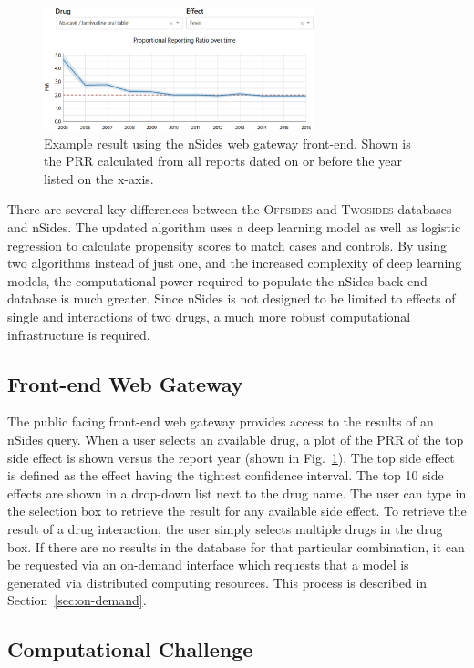\documentclass{ws-procs11x85}
\begin{document}
\begin{figure}[h]
\centerline{\includegraphics[width=0.7\textwidth]{prr}}
\caption{Example result using the nSides web gateway front-end. Shown
  is the PRR calculated from all reports dated on or before the year listed on the
  x-axis.}
\label{fig:prr}
\end{figure}

There are several key differences between the O\textsc{ffsides} and
T\textsc{wosides} databases and nSides. The updated algorithm uses a
deep learning model as well as logistic regression to calculate
propensity scores to match cases and controls. By using two algorithms
instead of just one, and the increased complexity of deep learning
models, the computational power required to populate the nSides
back-end database is much greater. Since nSides is not designed to be
limited to effects of single and interactions of two drugs, a much
more robust computational infrastructure is required.

\subsection{Front-end Web Gateway}
The public facing front-end web gateway provides access to the results
of an nSides query. When a user selects an available drug, a plot of the PRR of
the top side effect is shown versus the report year (shown in
Fig.~\ref{fig:prr}).  The top side effect is defined as the effect
having the tightest confidence interval. The top 10 side effects are
shown in a drop-down list next to the drug name. The user can type
in the selection box to retrieve the result for any available side
effect. To retrieve the result of a drug interaction, the user simply
selects multiple drugs in the drug box. If there are no results in the
database for that particular combination, it can be requested via an
on-demand interface which requests that a model is generated via
distributed computing resources.  This process is described in
Section~\ref{sec:on-demand}.

\subsection{Computational Challenge}
\end{document}
